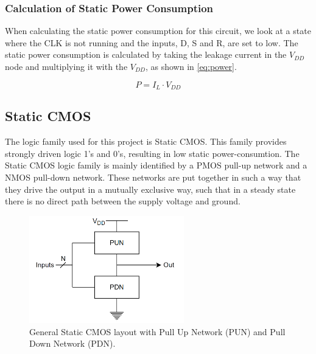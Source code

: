 \subsubsection{Calculation of Static Power Consumption}
When calculating the static power consumption for this circuit, we look at a state where the CLK is not running and the inputs, D, S and R, are set to low. The static power consumption is calculated by taking the leakage current in the $V_{DD}$ node and multiplying it with the $V_{DD}$, as shown in \autoref{eq:power}.

\begin{equation}
    \label{eq:power}
    P = I_L \cdot V_{DD}
\end{equation}

\subsection{Static CMOS}\label{subsec:static_cmos}

The logic family used for this project is Static CMOS. This family provides strongly driven logic 1's and 0's, resulting in low static power-consumtion. The Static CMOS logic family is mainly identified by a PMOS pull-up network and a NMOS pull-down network. These networks are put together in such a way that they drive the output in a mutually exclusive way, such that in a steady state there is no direct path between the supply voltage and ground.

\begin{figure}[H]
    \centering
    \includegraphics[width=0.6\textwidth]{Figures/Pull_UP_DOWN.png}
    \caption{General Static CMOS layout with Pull Up Network (PUN) and Pull Down Network (PDN).}
    \label{fig:static_CMOS}
\end{figure}




